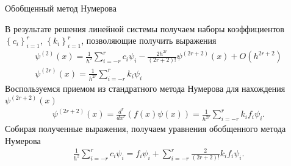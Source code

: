 \documentclass[10pt,pdf,hyperref={unicode},xcolor=dvipsnames]{beamer}
\newcommand{\lb}{\left(}
\newcommand{\rb}{\right)}
\newcommand{\lc}{\left\{}
\newcommand{\rc}{\right\}}
\newcommand{\psip}[1]{\psi^{(#1)}(x)}
\begin{document}
\begin{frame}{Обобщенный метод Нумерова}
    \begin{block}{}
        \vspace*{-0.5cm}
        В результате решения линейной системы получаем наборы коэффициентов $\lc c_i \rc_{i=1}^r$, $\lc k_i \rc_{i=1}^r$, позволяющие получить выражения
        \begin{gather}
            \psip{2} = \frac{1}{h^2} \sum_{i=-r}^r c_i \psi_i - \frac{2 h^{2r}}{(2r+2)!} \psip{2r+2} + O(h^{2r+2}) \\
            \psip{2r} = \frac{1}{h^{2r}} \sum_{i=-r}^r k_i \psi_i 
        \end{gather}
        Воспользуемся приемом из стандратного метода Нумерова для нахождения $\psip{2r+2}$
        \begin{gather}
            \psip{2r+2} = \frac{d^r}{dx^r} \lb f(x) \psi(x) \rb = \frac{1}{ h^{2r} } \sum_{i=-r}^r k_i f_i \psi_i.
        \end{gather}
        Собирая полученные выражения, получаем уравнения обобщенного метода Нумерова 
            \vspace*{-0.4cm}
        \begin{gather}
            \frac{1}{h^2} \sum_{i=-r}^r c_i \psi_i = f_i \psi_i + \sum_{i=-r}^r \frac{2}{(2r+2)!} k_i f_i \psi_i.
        \end{gather}
    \end{block}
\end{frame}
\end{document}
